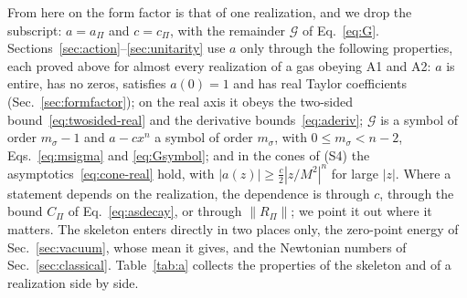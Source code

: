 \documentclass[a4paper,11pt]{article}
\begin{document}
From here on the form factor is that of one realization, and we drop the subscript: $a=a_\Pi$ and $c=c_\Pi$, with the remainder $\mathcal G$ of Eq.~\eqref{eq:G}. Sections~\ref{sec:action}--\ref{sec:unitarity} use $a$ only through the following properties, each proved above for almost every realization of a gas obeying A1 and A2: $a$ is entire, has no zeros, satisfies $a(0)=1$ and has real Taylor coefficients (Sec.~\ref{sec:formfactor}); on the real axis it obeys the two-sided bound~\eqref{eq:twosided-real} and the derivative bounds~\eqref{eq:aderiv}; $\mathcal G$ is a symbol of order $m_\sigma-1$ and $a-cx^n$ a symbol of order $m_\sigma$, with $0\le m_\sigma<n-2$, Eqs.~\eqref{eq:msigma} and \eqref{eq:Gsymbol}; and in the cones of (S4) the asymptotics~\eqref{eq:cone-real} hold, with $|a(z)|\ge\frac c2|z/M^2|^n$ for large $|z|$. Where a statement depends on the realization, the dependence is through $c$, through the bound $C_\Pi$ of Eq.~\eqref{eq:asdecay}, or through $\|R_\Pi\|$; we point it out where it matters. The skeleton enters directly in two places only, the zero-point energy of Sec.~\ref{sec:vacuum}, whose mean it gives, and the Newtonian numbers of Sec.~\ref{sec:classical}. Table~\ref{tab:a} collects the properties of the skeleton and of a realization side by side.
\end{document}
